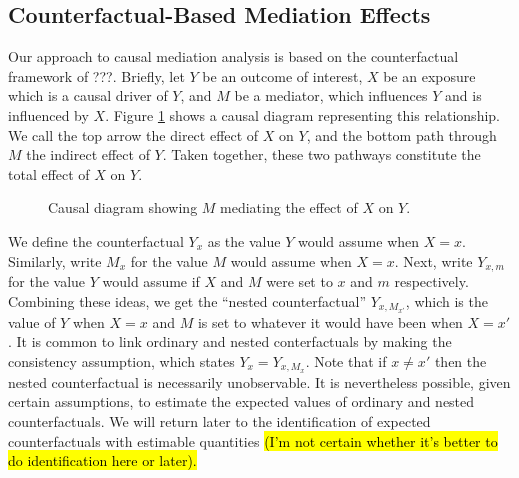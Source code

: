 \documentclass{article}
\begin{document}
\subsection{Counterfactual-Based Mediation Effects}

Our approach to causal mediation analysis is based on the counterfactual framework of ???. Briefly, let $Y$ be an outcome of interest, $X$ be an exposure which is a causal driver of $Y$, and $M$ be a mediator, which influences $Y$ and is influenced by $X$. Figure \ref{fig:simp_med} shows a causal diagram representing this relationship. We call the top arrow the direct effect of $X$ on $Y$, and the bottom path through $M$ the indirect effect of $Y$. Taken together, these two pathways constitute the total effect of $X$ on $Y$.

\begin{figure}
    \centering
      \caption{Causal diagram showing $M$ mediating the effect of $X$ on $Y$.}    
      \label{fig:simp_med}
\end{figure}

We define the counterfactual $Y_x$ as the value $Y$ would assume when $X=x$. Similarly, write $M_x$ for the value $M$ would assume when $X=x$. Next, write $Y_{x,m}$ for the value $Y$ would assume if $X$ and $M$ were set to $x$ and $m$ respectively. Combining these ideas, we get the ``nested counterfactual'' $Y_{x, M_{x'}}$, which is the value of $Y$ when $X=x$ and $M$ is set to whatever it would have been when $X=x'$. It is common to link ordinary and nested conterfactuals by making the consistency assumption, which states $Y_x = Y_{x, M_x}$. Note that if $x \neq x'$ then the nested counterfactual is necessarily unobservable. It is nevertheless possible, given certain assumptions, to estimate the expected values of ordinary and nested counterfactuals. We will return later to the identification of expected counterfactuals with estimable quantities \hl{(I'm not certain whether it's better to do identification here or later).}
\end{document}
